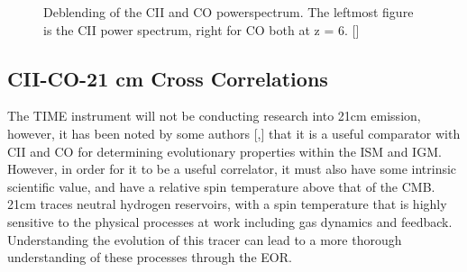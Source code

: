 \documentclass[manuscript]{aastex}
\begin{document}
\begin{figure}[h!]
    \centering
    \qquad
    \singlespace
    \caption[Deblending of the CII and CO power spectrums. -(\cite{Cheng2016})]{Deblending of the CII and CO powerspectrum. The leftmost figure is the CII power spectrum, right for CO both at z = 6. [\cite{Cheng2016}]}%
    \label{fig:example}%
\end{figure}

\subsection{CII-CO-21 cm Cross Correlations}
The TIME instrument will not be conducting research into 21cm emission, however, it has been noted by some authors [\cite{Zaroubi2012},\cite{Gong2012}] that it is a useful comparator with CII and CO for determining evolutionary properties within the ISM and IGM. However, in order for it to be a useful correlator, it must also have some intrinsic scientific value, and have a relative spin temperature above that of the CMB. 21cm traces neutral hydrogen reservoirs, with a spin temperature that is highly sensitive to the physical processes at work including gas dynamics and feedback. Understanding the evolution of this tracer can lead to a more thorough understanding of these processes through the EOR. 
\end{document}
